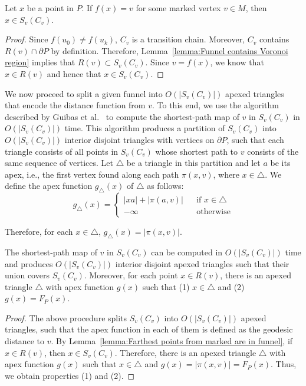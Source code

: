 \documentclass[a4paper,UKenglish]{lipics}
\newcommand{\F}[2]{\ensuremath{F_{\scriptscriptstyle #1}(#2)}}
\newcommand{\fn}[2]{\ensuremath{S_{\scriptscriptstyle #1}(#2)}}
\newcommand{\ff}[1]{\ensuremath{f(#1)}}
\newcommand{\g}[2]{\ensuremath{|\pi(#1, #2)|}}
\newcommand{\p}[2]{\ensuremath{\pi(#1, #2)}}
\begin{document}
\begin{lemma}\label{lemma:Farthest points from marked are in funnel}
Let $x$ be a point in $P$. If $\ff{x} = v$ for some marked vertex $v\in M$, then $x\in \fn{v}{C_v}$.
\end{lemma}
\begin{proof}
Since $\ff{u_0} \neq \ff{u_k}$, $C_v$ is a transition chain. Moreover, $C_v$ contains $R(v)\cap \partial P$ by definition. Therefore, Lemma~\ref{lemma:Funnel contains Voronoi region} implies that $R(v)\subset \fn{v}{C_v}$.
Since $v = \ff{x}$, we know that $x\in R(v)$ and hence that $x \in \fn{v}{C_v}$. 
\end{proof}

We now proceed to split a given funnel into $O(|\fn{v}{C_v}|)$ apexed triangles that encode the distance function from $v$. 
To this end, we use the algorithm described by Guibas et al.~\cite[Section 2]{guibasShortestPathQueries} to compute the shortest-path map of $v$ in $\fn{v}{C_v}$ in $O(|\fn{v}{C_v}|)$ time.
This algorithm produces a partition of $\fn{v}{C_v}$ into $O(|\fn{v}{C_v}|)$ interior disjoint triangles with vertices on $\partial P$, such that each triangle consists of all points in $\fn{v}{C_v}$ whose shortest path to $v$ consists of the same sequence of vertices.
Let $\triangle$ be a triangle in this partition and let $a$ be its apex, i.e., the first vertex found along each path $\p{x}{v}$, where $x\in \triangle$. We define the apex function $g_\triangle(x)$ of $\triangle$ as follows:
$$g_\triangle(x) = \left\{ \begin{array}{lll}
|x a| + \g{a}{v} && \text{if }x\in \triangle\\
-\infty&&\text{otherwise}
\end{array}\right.$$

Therefore, for each $x\in \triangle$, $g_\triangle(x) = \g{x}{v}$.

\begin{lemma}\label{lemma:Triangles inside funnels}
The shortest-path map of $v$ in $\fn{v}{C_v}$ can be computed in $O(|\fn{v}{C_v}|)$ time and produces $O(|\fn{v}{C_v}|)$ interior disjoint apexed triangles such that their union covers $\fn{v}{C_v}$. 
Moreover, for each point $x\in R(v)$,  
there is an apexed triangle $\triangle$ with apex function $g(x)$ such that 
(1) $x\in \triangle$ and (2) $g(x) = \F{P}{x}$.
\end{lemma}
\begin{proof}
The above procedure splits $\fn{v}{C_v}$ into $O(|\fn{v}{C_v}|)$ apexed triangles, such that the apex function in each of them is defined as the geodesic distance to $v$. 
By Lemma~\ref{lemma:Farthest points from marked are in funnel}, if $x\in R(v)$, then $x\in \fn{v}{C_v}$. 
Therefore, there is an apexed triangle $\triangle$ with apex function $g(x)$ such that $x\in \triangle$ and $g(x) = \g{x}{v} = \F{P}{x}$. Thus, we obtain properties (1) and (2).
\end{proof}
\end{document}
